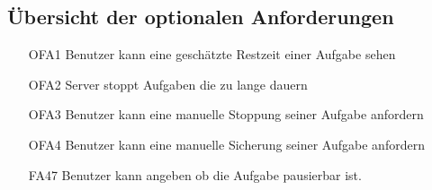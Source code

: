 \documentclass[a4paper,12pt]{article}
\begin{document}
\subsection{Übersicht der optionalen Anforderungen}
\begin{itemize}[nosep]
\leftskip=0.5cm
\item[OFA1] Benutzer kann eine geschätzte Restzeit einer Aufgabe sehen	
\item[OFA2] Server stoppt Aufgaben die zu lange dauern %
\item[OFA3] Benutzer kann eine manuelle Stoppung seiner Aufgabe anfordern
\item[OFA4] Benutzer kann eine manuelle Sicherung seiner Aufgabe anfordern
\item[FA47] Benutzer kann angeben ob die Aufgabe pausierbar ist. %
\end{itemize}






\end{document}
